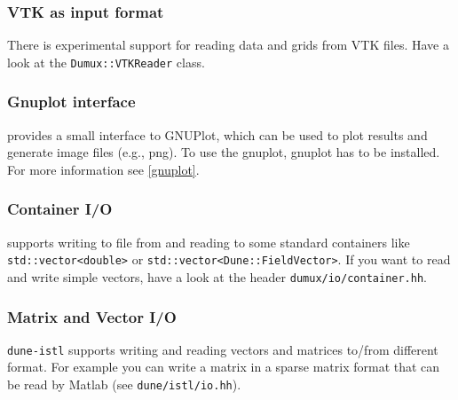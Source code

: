 \subsubsection{VTK as input format}
There is experimental support for reading data and grids from VTK files. Have a look at the \texttt{Dumux::VTKReader} class.

\subsubsection{Gnuplot interface}
\Dumux provides a small interface to GNUPlot, which can be used to plot results and generate
image files (e.g., png). To use the gnuplot, gnuplot has to be installed. For more information see \ref{gnuplot}.

\subsubsection{Container I/O}
\Dumux supports writing to file from and reading to some standard \Cplusplus containers like \texttt{std::vector<double>} or \texttt{std::vector<Dune::FieldVector>}.
If you want to read and write simple vectors, have a look at the header \texttt{dumux/io/container.hh}.

\subsubsection{Matrix and Vector I/O}
\texttt{dune-istl} supports writing and reading vectors and matrices to/from different format. For example you can write a matrix in a sparse matrix format that
can be read by Matlab (see \texttt{dune/istl/io.hh}).
